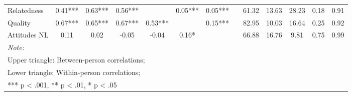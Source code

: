 \begin{table}
\begin{minipage}[t][\textheight][t]{\textwidth}
{\begin{tabular}[t]{lcccccccccccc}
\hspace{1em}Relatedness & 0.41*** & 0.63*** & 0.56*** &  & 0.05*** & 0.05*** &  & 61.32 & 13.63 & 28.23 & 0.18 & 0.91\\
\hspace{1em}Quality & 0.67*** & 0.65*** & 0.67*** & 0.53*** &  & 0.15*** &  & 82.95 & 10.03 & 16.64 & 0.25 & 0.92\\
\hspace{1em}Attitudes NL & 0.11 & 0.02 & -0.05 & -0.04 & 0.16* &  &  & 66.88 & 16.76 & 9.81 & 0.75 & 0.99\\
\bottomrule
\multicolumn{13}{l}{\rule{0pt}{1em}\textit{Note: }}\\
\multicolumn{13}{l}{\rule{0pt}{1em}Upper triangle: Between-person correlations;}\\
\multicolumn{13}{l}{\rule{0pt}{1em}Lower triangle: Within-person correlations;}\\
\multicolumn{13}{l}{\rule{0pt}{1em}*** p < .001, ** p < .01,  * p < .05}\\
\end{tabular}}
\end{minipage}
\end{table}
